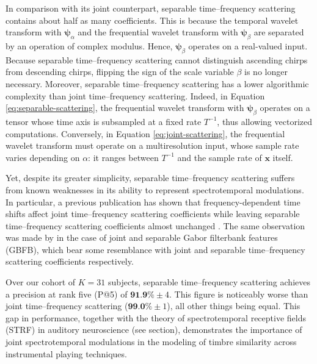 \documentclass{bmcart}
\newcommand{\lnameref}[1]{%
\bgroup
\let\nmu\MakeLowercase
\nameref{#1}\egroup}
\newcommand{\nmu}{}
\begin{document}
In comparison with its joint counterpart, separable time--frequency scattering contains about half as many coefficients.
This is because the temporal wavelet transform with $\boldsymbol{\psi}_\alpha$ and the frequential wavelet transform with $\boldsymbol{\psi}_\beta$ are separated by an operation of complex modulus.
Hence, $\boldsymbol{\psi}_\beta$ operates on a real-valued input.
Because separable time--frequency scattering cannot distinguish ascending chirps from descending chirps, flipping the sign of the scale variable $\beta$ is no longer necessary.
Moreover, separable time--frequency scattering has a lower algorithmic complexity than joint time--frequency scattering.
Indeed, in Equation \ref{eq:separable-scattering}, the frequential wavelet transform with $\boldsymbol{\psi}_{\beta}$ operates on a tensor whose time axis is subsampled at a fixed rate $T^{-1}$, thus allowing vectorized computations.
Conversely, in Equation \ref{eq:joint-scattering}, the frequential wavelet transform must operate on a multiresolution input, whose sample rate varies  depending on $\alpha$: it ranges between $T^{-1}$ and the sample rate of $\boldsymbol{x}$ itself.

Yet, despite its greater simplicity, separable time--frequency scattering suffers from known weaknesses in its ability to represent spectrotemporal modulations.
In particular, a previous publication has shown that frequency-dependent time shifts affect joint time--frequency scattering coefficients while leaving separable time--frequency scattering coefficients almost unchanged \cite{anden2019tsp}.
The same observation was made by \cite{schadler2015jasa} in the case of joint and separable Gabor filterbank features (GBFB), which bear some resemblance with joint and separable time--frequency scattering coefficients respectively.

Over our cohort of $K=31$ subjects, separable time--frequency scattering achieves a precision at rank five (P@5) of $\textbf{91.9\%} \pm 4$. This figure is noticeably worse than joint time--frequency scattering ($\textbf{99.0}\% \pm 1$), all other things being equal.
This gap in performance, together with the theory of spectrotemporal receptive fields (STRF) in auditory neuroscience (see \lnameref{sec:related-work} section), demonstrates the importance of joint spectrotemporal modulations in the modeling of timbre similarity across instrumental playing techniques.
\end{document}
